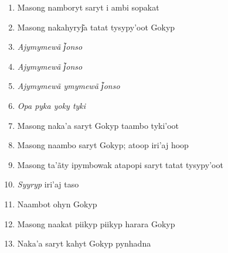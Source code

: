\begin{enumerate}
\item Masong namboryt saryt i ambi sopakat
\item Masong nakahyryj͂a tatat tysypy'oot Gokyp
\item \textit{Ajymymewã j͂onso}
\item \textit{Ajymymewã j͂onso}
\item \textit{Ajymymewã ymymewã j͂onso}
\item \textit{Opa pyka yoky tyki}
\item Masong naka'a saryt Gokyp taambo tyki'oot
\item Masong naambo saryt Gokyp; atoop iri'aj hoop
\item Masong ta'ãty ipymbowak atapopi saryt tatat tysypy'oot
\item \textit{Syyryp} iri'aj taso

\begin{center}\end{center}

\item Naambot ohyn Gokyp
\item Masong naakat piikyp piikyp harara Gokyp
\item Naka'a saryt kahyt Gokyp pynhadna
\end{enumerate}



\chapter*{}
\thispagestyle{empty}

\vspace*{\fill}
